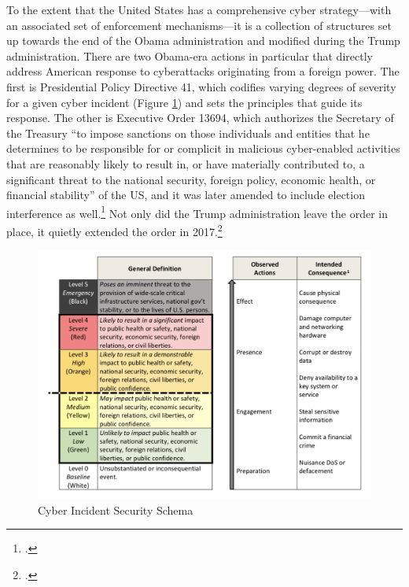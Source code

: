 \documentclass[11pt]{memoir}
\begin{document}
\begin{refsegment}
To the extent that the United States has a comprehensive cyber strategy---with an associated set of enforcement mechanisms---it is a collection of structures set up towards the end of the Obama administration and modified during the Trump administration. There are two Obama-era actions in particular that directly address American response to cyberattacks originating from a foreign power. The first is Presidential Policy Directive 41, which codifies varying degrees of severity for a given cyber incident (Figure \ref{severity-schema}) and sets the principles that guide its response. The other is Executive Order 13694, which authorizes the Secretary of the Treasury ``to impose sanctions on those individuals and entities that he determines to be responsible for or complicit in malicious cyber-enabled activities that are reasonably likely to result in, or have materially contributed to, a significant threat to the national security, foreign policy, economic health, or financial stability'' of the US, and it was later amended to include election interference as well.\footcite{daniel_our_2015} Not only did the Trump administration leave the order in place, it quietly extended the order in 2017.\footcite{uchill_white_2017}

\begin{figure}
\centering
\includegraphics[scale=0.53]{severity-schema.png}
\caption{Cyber Incident Security Schema}
\label{severity-schema}
\end{figure}


\end{refsegment}
\end{document}
